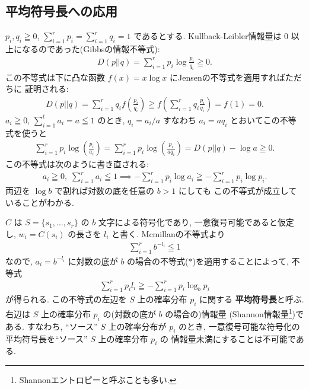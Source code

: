 \documentclass[12pt,twoside]{jarticle}
\theoremstyle{jplain}
\theoremstyle{jplain}
\theoremstyle{jplain}
\numberwithin{theorem}{section}
\numberwithin{equation}{section}
\numberwithin{figure}{section}
\numberwithin{table}{section}
\begin{document}

\subsection{平均符号長への応用}
\label{sec:average-code-length}

$p_i,q_i\geqq 0$, $\sum_{i=1}^r p_i=\sum_{i=1}^r q_i=1$ であるとする.
Kullback-Leibler情報量は $0$ 以上になるのであった(Gibbsの情報不等式):
\begin{align*}
D(p||q)=\sum_{i=1}^r p_i\log\frac{p_i}{q_i}\geqq 0.
\end{align*}
この不等式は下に凸な函数 $f(x)=x\log x$ にJensenの不等式を適用すればただちに
証明される:
\begin{align*}
D(p||q)
=\sum_{i=1}^r q_i f\left(\frac{p_i}{q_i}\right)
\geqq f\left(\sum_{i=1}^r q_i\frac{p_i}{q_i}\right)
=f(1)=0.
\end{align*}
$a_i\geqq 0$, $\sum_{i=1}^t a_i=a\leqq 1$ のとき, 
$q_i=a_i/a$ すなわち $a_i=a q_i$ とおいてこの不等式を使うと
\begin{align*}
\sum_{i=1}^r p_i\log\left(\frac{p_i}{a_i}\right)
=\sum_{i=1}^r p_i\log\left(\frac{p_i}{a q_i}\right)
=D(p||q)-\log a
\geqq 0.
\end{align*}
この不等式は次のように書き直される:
\begin{align*}
a_i\geqq 0,\; \sum_{i=1}^r a_i\leqq 1 \implies
-\sum_{i=1}^r p_i\log a_i \geqq -\sum_{i=1}^r p_i \log p_i.
\tag{$*$}
\end{align*}
両辺を $\log b$ で割れば対数の底を任意の $b>1$ にしても
この不等式が成立していることがわかる.

$C$ は $S=\{s_1,\ldots,s_r\}$ の $b$ 文字による符号化であり, 
一意復号可能であると仮定し, $w_i=C(s_i)$ の長さを $l_i$ と書く.
Mcmillanの不等式より
\begin{align*}
\sum_{i=1}^r b^{-l_i}\leqq 1
\end{align*}
なので, $a_i=b^{-l_i}$ に対数の底が $b$ の場合の不等式($*$)を適用することによって, 
不等式
\begin{align*}
\sum_{i=1}^r p_i l_i \geqq -\sum_{i=1}^r p_i \log_b p_i
\end{align*}
が得られる. この不等式の左辺を $S$ 上の確率分布 $p_i$ に関する
{\bf 平均符号長}と呼ぶ.
右辺は $S$ 上の確率分布 $p_i$ の(対数の底が $b$ の場合の)情報量
(Shannon情報量\footnote{Shannonエントロピーと呼ぶことも多い.})である.
すなわち, ``ソース'' $S$ 上の確率分布が $p_i$ のとき, 
一意復号可能な符号化の平均符号長を``ソース'' $S$ 上の確率分布 $p_i$ の
情報量未満にすることは不可能である.
\end{document}
